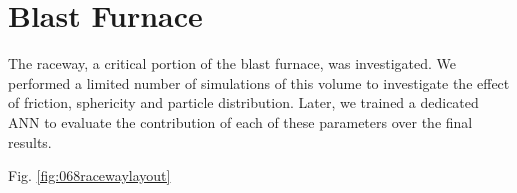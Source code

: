 
\chapter{Blast Furnace}
\label{cap:blastfurnace}

The raceway, a critical portion of the blast furnace, was investigated. We
performed a limited number of simulations of this volume to investigate the
effect of friction, sphericity and particle distribution.
Later, we trained a dedicated \acs{ANN} to evaluate the contribution of each of
these parameters over the final results.

Fig. \ref{fig:068racewaylayout}
